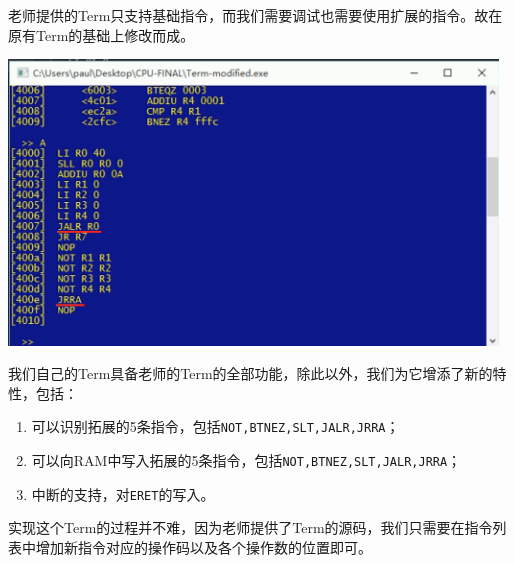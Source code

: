 老师提供的Term只支持基础指令，而我们需要调试也需要使用扩展的指令。故在原有Term的基础上修改而成。

\begin{center}
    \includegraphics[width=13cm]{image/extension/term}
    \label{fig:term}
\end{center}

我们自己的Term具备老师的Term的全部功能，除此以外，我们为它增添了新的特性，包括：

\begin{enumerate}
    \item 可以识别拓展的5条指令，包括\texttt{NOT,BTNEZ,SLT,JALR,JRRA}；
    \item 可以向RAM中写入拓展的5条指令，包括\texttt{NOT,BTNEZ,SLT,JALR,JRRA}；
    \item 中断的支持，对\texttt{ERET}的写入。
\end{enumerate}

实现这个Term的过程并不难，因为老师提供了Term的源码，我们只需要在指令列表中增加新指令对应的操作码以及各个操作数的位置即可。
